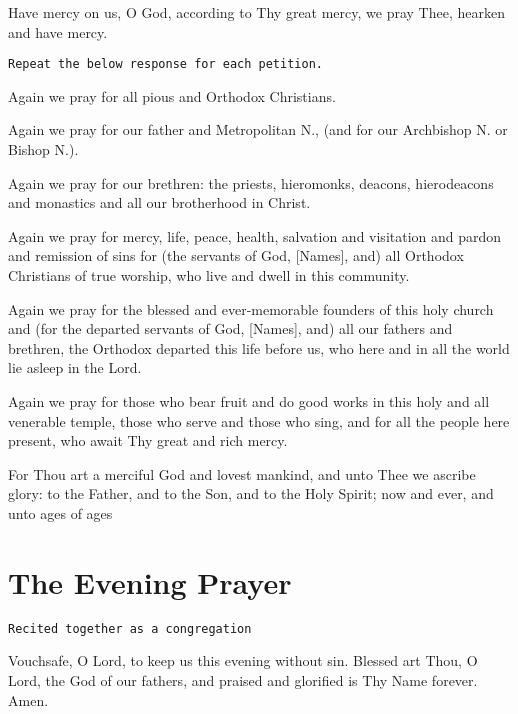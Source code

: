 \documentclass[twoside, letterpaper, 12pt]{report}
\newcommand{\instruction}[1]{%
  \texttt{\scriptsize{#1}}%
}
\newcommand{\centeredsection}[1]{%
  \needspace{10\baselineskip}%
  \section*{\centering{}#1}%
}
\begin{document}
\begin{deacon}
\item Have mercy on us, O God, according to Thy great mercy, we pray Thee, hearken
    and have mercy.
\end{deacon}

\instruction{Repeat the below response for each petition.}

\begin{deacon}
\item Again we pray for all pious and Orthodox Christians.
\item Again we pray for our father and Metropolitan N., (and for our Archbishop N. or Bishop N.).
\item Again we pray for our brethren: the priests, hieromonks, deacons, hierodeacons and monastics
    and all our brotherhood in Christ.
\item Again we pray for mercy, life, peace, health, salvation and visitation and pardon and
    remission of sins for (the servants of God, [Names], and) all Orthodox Christians of true
    worship, who live and dwell in this community.
\item Again we pray for the blessed and ever-memorable founders of this holy church and (for
    the departed servants of God, [Names], and) all our fathers and brethren, the Orthodox
    departed this life before us, who here and in all the world lie asleep in the Lord.
\item Again we pray for those who bear fruit and do good works in this holy and all venerable
    temple, those who serve and those who sing, and for all the people here present,
    who await Thy great and rich mercy.
\end{deacon}

\begin{priest}
\item For Thou art a merciful God and lovest mankind, and unto Thee we ascribe glory:
    to the Father, and to the Son, and to the Holy Spirit; now and ever, and unto ages of ages
\end{priest}


\centeredsection{The Evening Prayer}
\instruction{Recited together as a congregation}

Vouchsafe, O Lord, to keep us this evening without sin.
Blessed art Thou, O Lord, the God of our fathers,
and praised and glorified is Thy Name forever. Amen.
\end{document}
